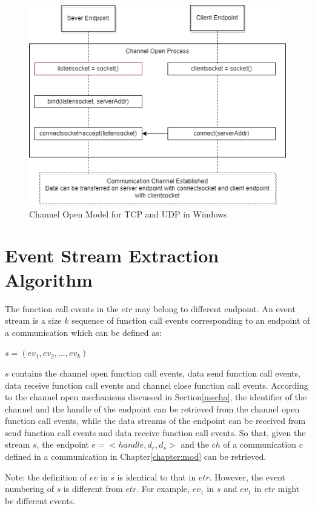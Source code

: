 \begin{figure}[H]
\centerline{\includegraphics[scale=0.6]{Figures/tcpudpchannelopen}}
 \caption{Channel Open Model for TCP and UDP in Windows}
\label{channelopen2}    
\end{figure}

\section{Event Stream Extraction Algorithm}
The function call events in the $etr$ may belong to different endpoint. An event stream is a size $k$ sequence of function call events corresponding to an endpoint of a communication which can be defined as:

$s = (ev_1, ev_2, ..., ev_k)$

$s$ contains the channel open function call events, data send function call events, data receive function call events and channel close function call events. According to the channel open mechanisms discussed in Section\ref{mecha}, the identifier of the channel and the handle of the endpoint can be retrieved from the channel open function call events, while the data streams of the endpoint can be received from send function call events and data receive function call events. So that, given the stream $s$, the endpoint $ e =<handle,  d_r, d_s>$ and the $ch$ of a communication $c$ defined in a communication in Chapter\ref{chapter:mod} can be retrieved.

Note: the definition of $ev$ in $s$ is identical to that in $etr$. However, the event numbering of $s$ is different from $etr$. For example, $ev_1$ in $s$ and $ev_1$ in $etr$ might be different events.

